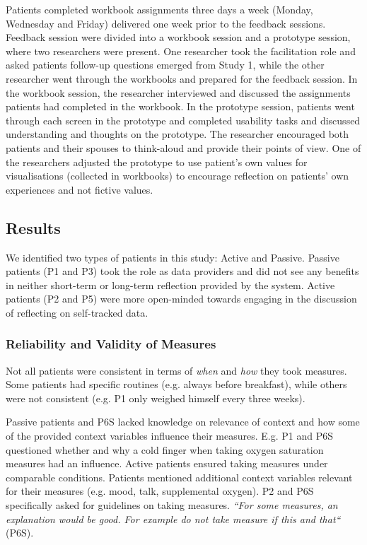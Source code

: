 Patients completed workbook assignments three days a week (Monday, Wednesday and Friday) delivered one week prior to the feedback sessions. Feedback session were divided into a workbook session and a prototype session, where two researchers were present. One researcher took the facilitation role and asked patients follow-up questions emerged from Study 1, while the other researcher went through the workbooks and prepared for the feedback session. In the workbook session, the researcher interviewed and discussed the assignments patients had completed in the workbook. In the prototype session, patients went through each screen in the prototype and completed usability tasks and discussed understanding and thoughts on the prototype. The researcher encouraged both patients and their spouses to think-aloud and provide their points of view. One of the researchers adjusted the prototype to use patient’s own values for visualisations (collected in workbooks) to encourage reflection on patients’ own experiences and not fictive values.

\subsection{Results}    
We identified two types of patients in this study: Active and Passive. Passive patients (P1 and P3) took the role as data providers and did not see any benefits in neither short-term or long-term reflection provided by the system. Active patients (P2 and P5) were more open-minded towards engaging in the discussion of reflecting on self-tracked data. 

\subsubsection{Reliability and Validity of Measures}
Not all patients were consistent in terms of \textit{when} and \textit{how} they took measures. Some patients had specific routines (e.g. always before breakfast), while others were not consistent (e.g. P1 only weighed himself every three weeks). 

Passive patients and P6S lacked knowledge on relevance of context and how some of the provided context variables influence their measures. E.g. P1 and P6S questioned whether and why a cold finger when taking oxygen saturation measures had an influence. Active patients ensured taking measures under comparable conditions. Patients mentioned additional context variables relevant for their measures (e.g. mood, talk, supplemental oxygen). P2 and P6S specifically asked for guidelines on taking measures. \textit{“For some measures, an explanation would be good. For example do not take measure if this and that“} (P6S).

